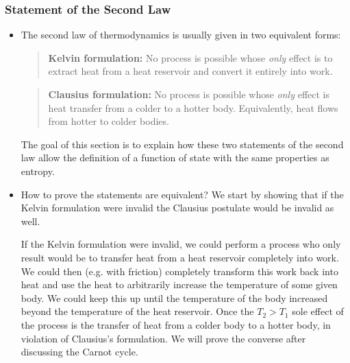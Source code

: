 \documentclass[11pt, a4paper]{article}
\begin{document}
\subsubsection{Statement of the Second Law}
\begin{itemize}
	\item The second law of thermodynamics is usually given in two equivalent forms:
	\begin{quote}
		\textbf{Kelvin formulation:} No process is possible whose \textit{only} effect is to extract heat from a heat reservoir and convert it entirely into work.
	\end{quote}
	\begin{quote}
		\textbf{Clausius formulation:} No process is possible whose \textit{only} effect is heat transfer from a colder to a hotter body. Equivalently, heat flows from hotter to colder bodies.
	\end{quote}
	The goal of this section is to explain how these two statements of the second law allow the definition of a function of state with the same properties as entropy.
	
	\item How to prove the statements are equivalent? We start by showing that if the Kelvin formulation were invalid the Clausius postulate would be invalid as well.
	
	If the Kelvin formulation were invalid, we could perform a process who only result would be to transfer heat from a heat reservoir completely into work. We could then (e.g. with friction) completely transform this work back into heat and use the heat to arbitrarily increase the temperature of some given body. We could keep this up until the temperature of the body increased beyond the temperature of the heat reservoir. Once the $ T_{2} > T_{1} $ sole effect of the process is the transfer of heat from a colder body to a hotter body, in violation of Clausius's formulation. We will prove the converse after discussing the Carnot cycle.
	

\end{itemize}
\end{document}
